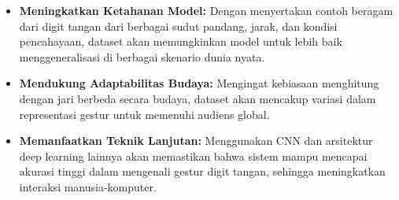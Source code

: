 \documentclass[12pt,a4paper]{article}
\begin{document}
\begin{itemize}
    \begin{itemize}
    \item \textbf{Meningkatkan Ketahanan Model: } Dengan menyertakan contoh beragam dari digit tangan dari berbagai sudut pandang, jarak, dan kondisi pencahayaan, dataset akan memungkinkan model untuk lebih baik menggeneralisasi di berbagai skenario dunia nyata.

    \item \textbf{Mendukung Adaptabilitas Budaya: }  Mengingat kebiasaan menghitung dengan jari berbeda secara budaya, dataset akan mencakup variasi dalam representasi gestur untuk memenuhi audiens global.

    \item \textbf{Memanfaatkan Teknik Lanjutan: }  Menggunakan CNN dan arsitektur deep learning lainnya akan memastikan bahwa sistem mampu mencapai akurasi tinggi dalam mengenali gestur digit tangan, sehingga meningkatkan interaksi manusia-komputer.
    
    \end{itemize} 

\end{itemize}

\end{document}
